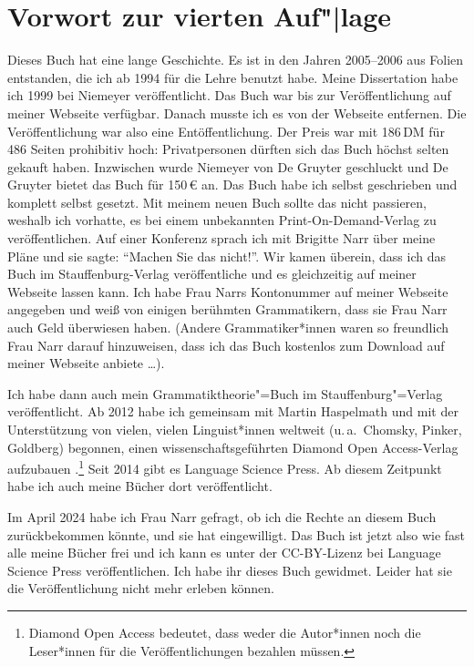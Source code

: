 \section*{Vorwort zur vierten Auf"|lage}

Dieses Buch hat eine lange Geschichte. Es ist in den Jahren 2005–2006 aus Folien entstanden, die ich
ab 1994 für die Lehre benutzt habe. Meine Dissertation habe ich 1999 bei Niemeyer
veröffentlicht. Das Buch war bis zur Veröffentlichung auf meiner Webseite verfügbar. Danach musste
ich es von der Webseite entfernen. Die Veröffentlichung war also eine Entöffentlichung. Der Preis
war mit 186\,DM für 486 Seiten prohibitiv hoch: Privatpersonen dürften sich das Buch höchst selten
gekauft haben. Inzwischen wurde Niemeyer von De Gruyter geschluckt und De Gruyter bietet das Buch für 150\,€
an. Das Buch habe ich selbst geschrieben und komplett selbst gesetzt. Mit meinem neuen Buch sollte das nicht passieren,
weshalb ich vorhatte, es bei einem unbekannten Print-On-Demand-Verlag zu veröffentlichen. Auf einer
Konferenz sprach ich mit Brigitte Narr über meine Pläne und sie sagte: "`Machen Sie das
nicht!"'. Wir kamen überein, dass ich das Buch im Stauffenburg-Verlag veröffentliche und es
gleichzeitig auf meiner Webseite lassen kann. Ich habe Frau Narrs Kontonummer auf meiner Webseite
angegeben und weiß von einigen berühmten Grammatikern, dass sie Frau Narr auch Geld überwiesen
haben. (Andere Grammatiker*innen waren so freundlich Frau Narr darauf hinzuweisen, dass ich das Buch
kostenlos zum Download auf meiner Webseite anbiete \ldots). 

Ich habe dann auch mein Grammatiktheorie"=Buch im Stauffenburg"=Verlag veröffentlicht. Ab 2012 habe
ich gemeinsam mit Martin Haspelmath und mit der Unterstützung von vielen, vielen Linguist*innen
weltweit (u.\,a.\ Chomsky, Pinker, Goldberg) begonnen, einen wissenschaftsgeführten Diamond Open
Access-Verlag aufzubauen \citep{MuellerOA}.\footnote{Diamond Open Access bedeutet, dass weder die Autor*innen noch die
Leser*innen für die Veröffentlichungen bezahlen müssen.%
} Seit 2014 gibt es Language Science Press. Ab diesem Zeitpunkt habe ich
auch meine Bücher dort veröffentlicht. 

Im April 2024 habe ich Frau Narr gefragt, ob ich die Rechte an diesem Buch zurückbekommen könnte,
und sie hat eingewilligt. Das Buch ist jetzt also wie fast alle meine Bücher frei und ich kann es
unter der CC-BY-Lizenz bei Language Science Press veröffentlichen. Ich habe ihr dieses Buch
gewidmet. Leider hat sie die Veröffentlichung nicht mehr erleben können.

